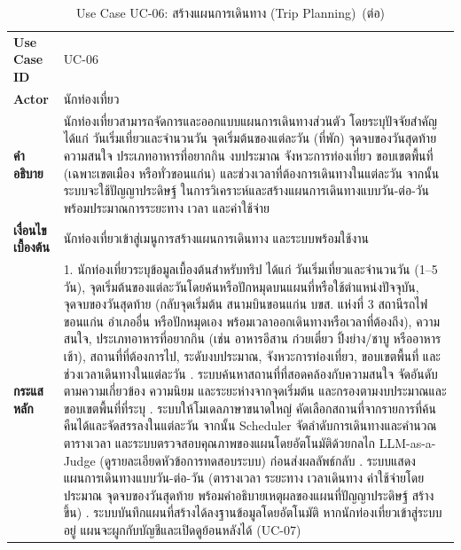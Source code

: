 \begin{longtable}{|p{3.2cm}|p{10cm}|}
\caption{Use Case UC-06: สร้างแผนการเดินทาง (Trip Planning)}\label{tab:uc06}\\
\hline
\endfirsthead
\caption[]{Use Case UC-06: สร้างแผนการเดินทาง (Trip Planning)~(\textnormal{ต่อ})}\\
\hline
\endhead
\textbf{Use Case ID} & UC-06 \\ \hline
\textbf{Actor} & นักท่องเที่ยว \\ \hline
\textbf{คำอธิบาย} & นักท่องเที่ยวสามารถจัดการและออกแบบแผนการเดินทางส่วนตัว โดยระบุปัจจัยสำคัญ ได้แก่ วันเริ่มเที่ยวและจำนวนวัน จุดเริ่มต้นของแต่ละวัน (ที่พัก) จุดจบของวันสุดท้าย ความสนใจ ประเภทอาหารที่อยากกิน งบประมาณ จังหวะการท่องเที่ยว ขอบเขตพื้นที่ (เฉพาะเขตเมือง หรือทั่วขอนแก่น) และช่วงเวลาที่ต้องการเดินทางในแต่ละวัน จากนั้นระบบจะใช้ปัญญาประดิษฐ์ ในการวิเคราะห์และสร้างแผนการเดินทางแบบวัน-ต่อ-วัน พร้อมประมาณการระยะทาง เวลา และค่าใช้จ่าย \\ \hline
\textbf{เงื่อนไขเบื้องต้น} & นักท่องเที่ยวเข้าสู่เมนูการสร้างแผนการเดินทาง และระบบพร้อมใช้งาน \\ \hline
\textbf{กระแสหลัก} & 1. นักท่องเที่ยวระบุข้อมูลเบื้องต้นสำหรับทริป ได้แก่ วันเริ่มเที่ยวและจำนวนวัน (1--5 วัน), จุดเริ่มต้นของแต่ละวันโดยค้นหรือปักหมุดบนแผนที่หรือใช้ตำแหน่งปัจจุบัน, จุดจบของวันสุดท้าย (กลับจุดเริ่มต้น สนามบินขอนแก่น บขส. แห่งที่ 3 สถานีรถไฟขอนแก่น อำเภออื่น หรือปักหมุดเอง พร้อมเวลาออกเดินทางหรือเวลาที่ต้องถึง), ความสนใจ, ประเภทอาหารที่อยากกิน (เช่น อาหารอีสาน ก๋วยเตี๋ยว ปิ้งย่าง/ชาบู หรืออาหารเช้า), สถานที่ที่ต้องการไป, ระดับงบประมาณ, จังหวะการท่องเที่ยว, ขอบเขตพื้นที่ และช่วงเวลาเดินทางในแต่ละวัน \newline 2. ระบบค้นหาสถานที่ที่สอดคล้องกับความสนใจ จัดอันดับตามความเกี่ยวข้อง ความนิยม และระยะห่างจากจุดเริ่มต้น และกรองตามงบประมาณและขอบเขตพื้นที่ที่ระบุ \newline 3. ระบบให้โมเดลภาษาขนาดใหญ่ คัดเลือกสถานที่จากรายการที่ค้นคืนได้และจัดสรรลงในแต่ละวัน จากนั้น Scheduler จัดลำดับการเดินทางและคำนวณตารางเวลา และระบบตรวจสอบคุณภาพของแผนโดยอัตโนมัติด้วยกลไก LLM-as-a-Judge (ดูรายละเอียดหัวข้อการทดสอบระบบ) ก่อนส่งผลลัพธ์กลับ \newline 4. ระบบแสดงแผนการเดินทางแบบวัน-ต่อ-วัน (ตารางเวลา ระยะทาง เวลาเดินทาง ค่าใช้จ่ายโดยประมาณ จุดจบของวันสุดท้าย พร้อมคำอธิบายเหตุผลของแผนที่ปัญญาประดิษฐ์ สร้างขึ้น) \newline 5. ระบบบันทึกแผนที่สร้างได้ลงฐานข้อมูลโดยอัตโนมัติ หากนักท่องเที่ยวเข้าสู่ระบบอยู่ แผนจะผูกกับบัญชีและเปิดดูย้อนหลังได้ (UC-07) \\ \hline

\end{longtable}
